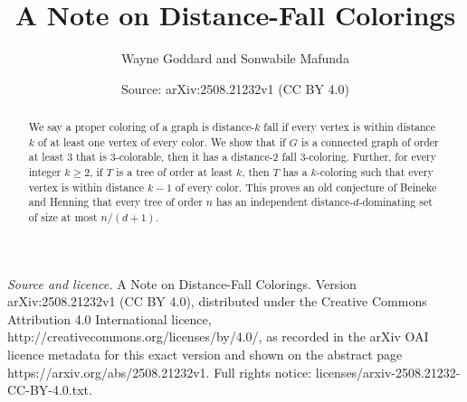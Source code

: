 \documentclass[10pt,a4paper]{amsart}
\title[A Note on Distance-Fall Colorings]{A Note on Distance-Fall Colorings}
\author{Wayne Goddard and Sonwabile Mafunda}
\date{Source: arXiv:2508.21232v1 (CC BY 4.0)}
\numberwithin{equation}{theorem}
\begin{document}
\begin{abstract}
We say a proper coloring  of a graph is distance-$k$ fall if every vertex is within distance $k$ 
of at least one vertex of every color. We show that 
if $G$ is a connected graph of order at least $3$ that is $3$-colorable, then
it has a distance-2 fall 3-coloring. Further, for every integer $k\ge 2$,
if $T$ is a tree of order at least $k$, then $T$ has a $k$-coloring 
such that every vertex is within distance $k-1$ of every color.
This proves an old conjecture of Beineke and Henning that every tree
of order $n$ has an independent distance-$d$-dominating set of size at most $n/(d + 1)$.
\end{abstract}
\maketitle
\noindent\emph{Source and licence.} A Note on Distance-Fall Colorings. Version arXiv:2508.21232v1 (CC BY 4.0), distributed under the Creative Commons Attribution 4.0 International licence, http://creativecommons.org/licenses/by/4.0/, as recorded in the arXiv OAI licence metadata for this exact version and shown on the abstract page https://arxiv.org/abs/2508.21232v1. Full rights notice: licenses/arxiv-2508.21232-CC-BY-4.0.txt.\par\smallskip
\end{document}
